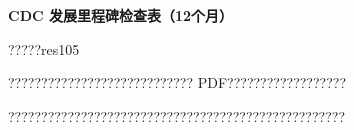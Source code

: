 \documentclass[11pt]{article}
\begin{document}
{\color[HTML]{0A84FF}\LARGE\bfseries CDC 发展里程碑检查表（12个月）\par}
{\color[HTML]{667085}\small ?????res105\par}
\vspace{1em}
???????????????????????????? PDF??????????????????

???????????????????????????????????????????????????
\end{document}
